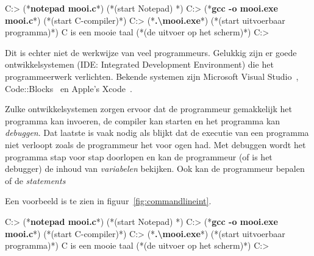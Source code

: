 \documentclass[12pt,a4paper,final,twoside,fleqn]{book}
\begin{document}
\begin{dosbox}[title=Een voorbeeld van een command line interface.,label=fig:commandlineint]
  C:\Users\Cbook> (*\textbf{notepad mooi.c}*) (*\hfill\textrm{(start Notepad)} *)
  C:\Users\Cbook> (*\textbf{gcc -o mooi.exe mooi.c}*) (*\hfill\textrm{(start C-compiler)}*)
  C:\Users\Cbook> (*\textbf{.\textbackslash mooi.exe}*) (*\hfill\textrm{(start uitvoerbaar programma)}*)
  C is een mooie taal (*\hfill\textrm{(de uitvoer op het scherm)}*)
  C:\Users\Cbook>
\end{dosbox}
Dit is echter niet de werkwijze van veel programmeurs. Gelukkig zijn er goede ontwikkelsystemen (IDE: Integrated Development Environment) die het programmeerwerk verlichten. Bekende systemen zijn Microsoft Visual Studio~\cite{vs2022}, Code::Blocks~\cite{codeblocks2020} en Apple's Xcode~\cite{xcode2020}.

Zulke ontwikkelsystemen zorgen ervoor dat de programmeur gemakkelijk het programma kan invoeren, de compiler kan starten en het programma kan \textsl{debuggen}. Dat laatste is vaak nodig als blijkt dat de executie van een programma niet verloopt zoals de programmeur het voor ogen had. Met debuggen wordt het programma stap voor stap doorlopen en kan de programmeur (of is het debugger) de inhoud van \textsl{variabelen} bekijken. Ook kan de programmeur bepalen of de \textsl{statements}

 Een voorbeeld is te zien in figuur~\ref{fig:commandlineint}.


\begin{dosbox}[title=Een voorbeeld van een command line interface.,label=fig:commandlineint]
  C:\Users\Cbook> (*\textbf{notepad mooi.c}*) (*\hfill\textrm{(start Notepad)} *)
  C:\Users\Cbook> (*\textbf{gcc -o mooi.exe mooi.c}*) (*\hfill\textrm{(start C-compiler)}*)
  C:\Users\Cbook> (*\textbf{.\textbackslash mooi.exe}*) (*\hfill\textrm{(start uitvoerbaar programma)}*)
  C is een mooie taal (*\hfill\textrm{(de uitvoer op het scherm)}*)
  C:\Users\Cbook>
\end{dosbox}
\end{document}
